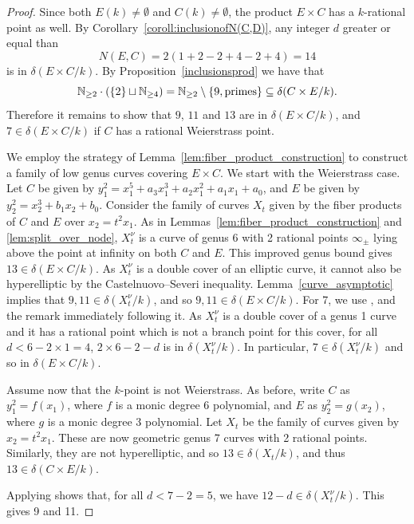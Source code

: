 \documentclass[a4paper,11pt]{amsart}
\theoremstyle{plain}
\theoremstyle{remark}
\newcommand{\nn}{\mathbb{N}}
\newcommand{\dendegs}{\delta}
\begin{document}
\begin{proof}
    Since both \(E(k) \neq \emptyset\) and \(C(k) \neq \emptyset\), the product \(E \times C\) has a $k$-rational point as well.
    By Corollary~\ref{coroll:inclusionofN(C,D)}, any integer $d$ greater or equal than 
    \[
        N(E,C)=2(1+2-2+4-2+4)=14
    \]
    is in $\dendegs(E\times C/k)$.
    By Proposition~\ref{inclusionsprod} we have that
    \[
        \nn_{\geq 2} \cdot ( \{2\} \sqcup \nn_{\geq 4}) = \nn_{\geq 2} \setminus \{9, \textup{primes} \} \subseteq \dendegs(C\times E/k).
    \]
    Therefore it remains to show that $9$, $11$ and $13$ are in $\dendegs(E\times C/k)$, and $7 \in \dendegs(E\times C/k)$ if \(C\) has a rational Weierstrass point.

    We employ the strategy of Lemma~\ref{lem:fiber_product_construction} to construct a family of low genus curves covering \(E \times C\).
    We start with the Weierstrass case. Let $C$ be given by $y_1^2 = x_1^5 + a_3 x_1^3 + a_2 x_1^2 + a_1 x_1 + a_0$, and $E$ be given by $y_2^2 = x_2^3 + b_1 x_2 + b_0$. Consider the family of curves $X_t$ given by the fiber products of $C$ and $E$ over $x_2 = t^2 x_1$. As in  Lemmas~\ref{lem:fiber_product_construction} and \ref{lem:split_over_node}, $X_t^\nu$ is a curve of genus 6 with 2 rational points $\infty_{\pm}$ lying above the point at infinity on both \(C\) and \(E\). 
    This improved genus bound gives $13 \in \dendegs(E \times C / k)$.
    As $X_t^\nu$ is a double cover of an elliptic curve, it cannot also be hyperelliptic by the Castelnuovo--Severi inequality. Lemma~\ref{curve_asymptotic} implies that $9, 11 \in \dendegs(X_t^\nu / k)$, and so $9, 11 \in \dendegs(E \times C / k)$. 
    For 7, we use , and the remark immediately following it. As $X_t^{\nu}$ is a double cover of a genus 1 curve and it has a rational point which is not a branch point for this cover, for all $d < 6 - 2\times1 = 4$, $2\times6 - 2 - d$ is in $\dendegs(X_t^{\nu} / k)$. In particular, $7 \in \dendegs(X_t^{\nu} / k)$ and so in $\dendegs(E \times C / k)$.
    
    Assume now that the $k$-point is not Weierstrass. %
    As before, write $C$ as $y_1^2 = f(x_1)$, where $f$ is a monic degree 6 polynomial, and $E$ as $y_2^2 = g(x_2)$, where $g$ is a monic degree 3 polynomial. Let $X_t$ be the family of curves given by $x_2 = t^2 x_1$. These are now geometric genus 7 curves with 2 rational points. Similarly, they are not hyperelliptic, and so $13 \in \dendegs(X_t / k)$, and thus $13 \in \dendegs(C \times E / k)$. 

    Applying  shows that, for all $d < 7 - 2 = 5$, we have $12 - d \in \dendegs(X_t^\nu / k)$. This gives 9 and 11.
\end{proof}
\end{document}
